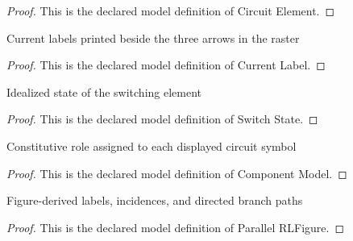 \begin{proof}
  This is the declared model definition of Circuit Element.
\end{proof}
\begin{definition}
  \label{def:physics:phyx-mini-0985:phyxminiproblems-problemphyxmini0985-currentlabel}
  Current labels printed beside the three arrows in the raster
\end{definition}
\begin{proof}
  This is the declared model definition of Current Label.
\end{proof}
\begin{definition}
  \label{def:physics:phyx-mini-0985:phyxminiproblems-problemphyxmini0985-switchstate}
  Idealized state of the switching element
\end{definition}
\begin{proof}
  This is the declared model definition of Switch State.
\end{proof}
\begin{definition}
  \label{def:physics:phyx-mini-0985:phyxminiproblems-problemphyxmini0985-componentmodel}
  Constitutive role assigned to each displayed circuit symbol
\end{definition}
\begin{proof}
  This is the declared model definition of Component Model.
\end{proof}
\begin{definition}
  \label{def:physics:phyx-mini-0985:phyxminiproblems-problemphyxmini0985-parallelrlfigure}
  Figure-derived labels, incidences, and directed branch paths
\end{definition}
\begin{proof}
  This is the declared model definition of Parallel RLFigure.
\end{proof}
